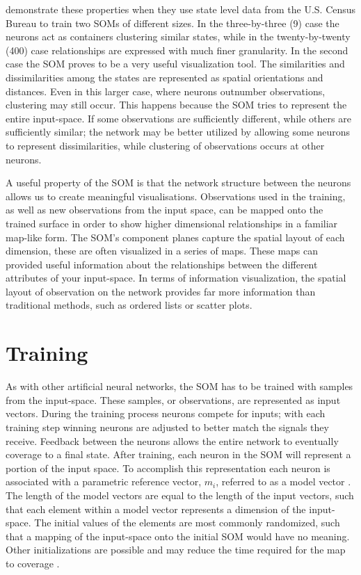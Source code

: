 \cite{skupin08} demonstrate these properties when they use state level data
from the U.S. Census Bureau to train two SOMs of different sizes.  In the
three-by-three (9) case the neurons act as containers clustering similar
states, while in the twenty-by-twenty (400) case relationships are expressed
with much finer granularity.  In the second case the SOM proves to be a very
useful visualization tool.  The similarities and dissimilarities among the
states are represented as spatial orientations and distances.  Even in this
larger case, where neurons outnumber observations, clustering may still occur.
This happens because the SOM tries to represent the entire input-space.  If
some observations are sufficiently different, while others are sufficiently
similar; the network may be better utilized by allowing some neurons to
represent dissimilarities, while clustering of observations occurs at other
neurons.

A useful property of the SOM is that the network structure between the neurons
allows us to create meaningful visualisations.  Observations used in the
training, as well as new observations from the input space, can be mapped
onto the trained surface in order to show higher dimensional relationships in a
familiar map-like form. The SOM's component planes capture the spatial layout
of each dimension, these are often visualized in a series of maps.  These
maps can provided useful information about the relationships between the
different attributes of your input-space.  In terms of information
visualization, the spatial layout of observation on the network provides far
more information than traditional methods, such as ordered lists or scatter
plots.

\section{Training}
As with other artificial neural networks, the SOM has to be trained with
samples from the input-space.  These samples, or observations, are represented
as input vectors.  During the training process neurons compete for inputs;
with each training step winning neurons are adjusted to better match the
signals they receive.  Feedback between the neurons allows the entire network to
eventually coverage to a final state. After training, each neuron in the SOM
will represent a portion of the input space.  To accomplish this
representation each neuron is associated with a parametric reference vector,
\(m_i\), referred to as a model vector \citep{Kohonen2000}.  The length of the
model vectors are equal to the length of the input vectors, such that each
element within a model vector represents a dimension of the input-space.  The
initial values of the elements are most commonly randomized, such that a
mapping of the input-space onto the initial SOM would have no meaning. Other
initializations are possible and may reduce the time required for the map to
coverage \citep{Kohonen2000}.

